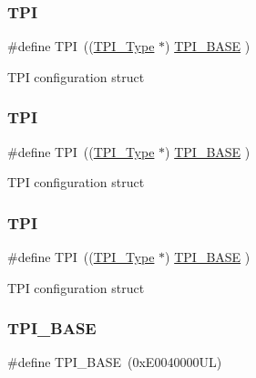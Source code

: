 \subsubsection{\texorpdfstring{TPI}{TPI}\hspace{0.1cm}{\footnotesize\ttfamily [1/3]}}
{\footnotesize\ttfamily \#define T\+PI~((\mbox{\hyperlink{struct_t_p_i___type}{T\+P\+I\+\_\+\+Type}}       $\ast$)     \mbox{\hyperlink{group___c_m_s_i_s__core__base_ga2b1eeff850a7e418844ca847145a1a68}{T\+P\+I\+\_\+\+B\+A\+SE}}      )}

T\+PI configuration struct \mbox{\label{group___c_m_s_i_s__core__base_ga8b4dd00016aed25a0ea54e9a9acd1239}} 
\subsubsection{\texorpdfstring{TPI}{TPI}\hspace{0.1cm}{\footnotesize\ttfamily [2/3]}}
{\footnotesize\ttfamily \#define T\+PI~((\mbox{\hyperlink{struct_t_p_i___type}{T\+P\+I\+\_\+\+Type}}       $\ast$)     \mbox{\hyperlink{group___c_m_s_i_s__core__base_ga2b1eeff850a7e418844ca847145a1a68}{T\+P\+I\+\_\+\+B\+A\+SE}}      )}

T\+PI configuration struct \mbox{\label{group___c_m_s_i_s__core__base_ga8b4dd00016aed25a0ea54e9a9acd1239}} 
\subsubsection{\texorpdfstring{TPI}{TPI}\hspace{0.1cm}{\footnotesize\ttfamily [3/3]}}
{\footnotesize\ttfamily \#define T\+PI~((\mbox{\hyperlink{struct_t_p_i___type}{T\+P\+I\+\_\+\+Type}}       $\ast$)     \mbox{\hyperlink{group___c_m_s_i_s__core__base_ga2b1eeff850a7e418844ca847145a1a68}{T\+P\+I\+\_\+\+B\+A\+SE}}      )}

T\+PI configuration struct \mbox{\label{group___c_m_s_i_s__core__base_ga2b1eeff850a7e418844ca847145a1a68}} 
\subsubsection{\texorpdfstring{TPI\_BASE}{TPI\_BASE}\hspace{0.1cm}{\footnotesize\ttfamily [1/3]}}
{\footnotesize\ttfamily \#define T\+P\+I\+\_\+\+B\+A\+SE~(0x\+E0040000\+U\+L)}

